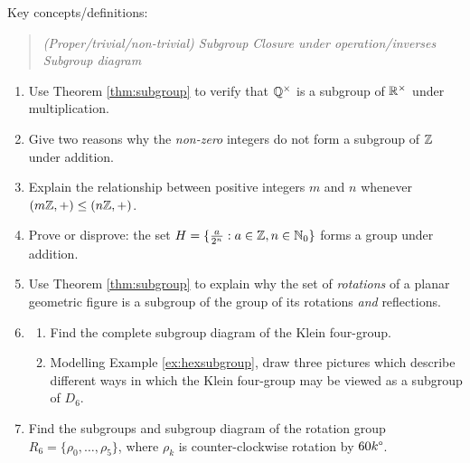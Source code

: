 \goodbreak

\begin{exercises}
Key concepts/definitions:
\begin{quote}
	\emph{(Proper/trivial/non-trivial) Subgroup
	\quad Closure under operation/inverses
	\quad Subgroup diagram}
\end{quote}

\begin{enumerate}
  \item Use Theorem \ref{thm:subgroup} to verify that $\Q^\times$ is a subgroup of $\R^\times$ under multiplication.
  
	\item Give two reasons why the \emph{non-zero} integers do not form a subgroup of $\Z$ under addition.
  	
  \item Explain the relationship between positive integers $m$ and $n$ whenever $(m\Z,+)\le (n\Z,+)$.

  \item Prove or disprove: the set $H=\{\frac a{2^n}:a\in\Z,n\in\N_0\}$ forms a group under addition.
    
  \item Use Theorem \ref{thm:subgroup} to explain why the set of \emph{rotations} of a planar geometric figure is a subgroup of the group of its rotations \emph{and} reflections.
  
 
  \item\begin{enumerate}
    \item Find the complete subgroup diagram of the Klein four-group.
  	\item Modelling Example \ref{ex:hexsubgroup}, draw three pictures which describe different ways in which the Klein four-group may be viewed as a subgroup of $D_6$.
  \end{enumerate}
  
  \item Find the subgroups and subgroup diagram of the rotation group $R_6=\{\rho_0,\ldots,\rho_5\}$, where $\rho_k$ is counter-clockwise rotation by $\ang{60k}$. 
  
  
  

\end{enumerate}
\end{exercises}
